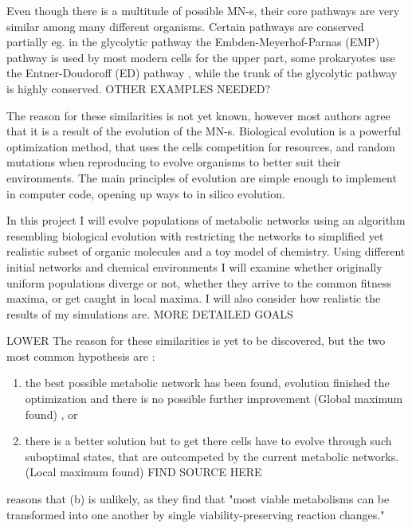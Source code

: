 \documentclass[10pt,a4paper]{article}
\begin{document}
	Even though there is a multitude of possible MN-s, their core pathways are very similar among many different organisms. Certain pathways are conserved partially  eg. in the glycolytic pathway the Embden-Meyerhof-Parnas (EMP) pathway \cite{EMPpathway} is used by most modern cells for the upper part,  some prokaryotes  use the Entner-Doudoroff (ED) pathway \cite{EDpathway}, while the trunk of the glycolytic pathway is highly conserved. OTHER EXAMPLES NEEDED? 

	The reason for these similarities is not yet known, however most authors agree that it is a result of the evolution of the MN-s. 
	 Biological evolution is a powerful optimization method, that uses the cells competition for resources, and random mutations when reproducing to evolve organisms to better suit their environments. The main principles of evolution are simple enough to implement in computer code, opening up ways to in silico evolution. 



	In this project I will evolve populations of metabolic networks using an algorithm resembling biological evolution with restricting the networks to simplified yet realistic subset of organic molecules and a toy model of chemistry. Using different initial networks and chemical environments I will examine whether originally uniform populations diverge or not, whether they arrive to the common fitness maxima, or get caught in local maxima. I will also consider how realistic the results of my simulations are.  MORE DETAILED GOALS



	LOWER The reason for these similarities is yet to be discovered, but the two most common hypothesis  are : 
	\begin{enumerate}[label=(\alph*)]
	\item the best possible metabolic network has been found, evolution finished the optimization and there is no possible further improvement (Global maximum found) \cite{theoretical} \cite{latent} \cite{strategy}, or 
	\item there is a better solution but to get there cells have to evolve through such suboptimal states, that are outcompeted by the current metabolic networks. (Local maximum found) FIND SOURCE HERE
	\end{enumerate} 
	 \cite{historical} reasons that (b) is unlikely, as they find that  "most viable metabolisms can be transformed into one another by single viability-preserving reaction changes."  
\end{document}
